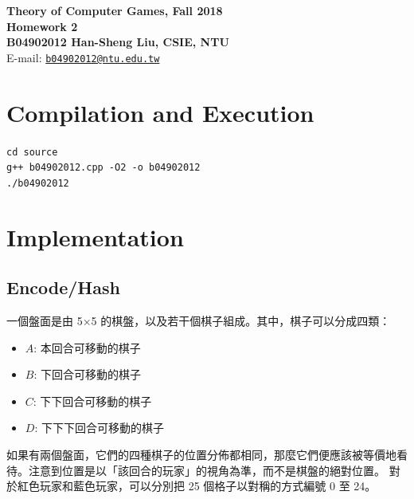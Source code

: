 \documentclass[12pt,a4paper]{article}
\begin{document}
\begin{center}
\textbf{\Large Theory of Computer Games, Fall 2018\\}
\textbf{\Large Homework 2\\} 
\vspace{5pt}
\textbf{B04902012 Han-Sheng Liu, CSIE, NTU}\\
E-mail: \href{mailto:b04902012@ntu.edu.tw}{\texttt{b04902012@ntu.edu.tw}}\\

\end{center}
\vspace{5pt}
\section{Compilation and Execution}
\texttt{cd source}\\
\texttt{g++ b04902012.cpp -O2 -o b04902012}\\
\texttt{./b04902012}
\section{Implementation}
    \subsection{Encode/Hash}
        一個盤面是由 5$\times$5 的棋盤，以及若干個棋子組成。其中，棋子可以分成四類：
        \begin{itemize}
        \item \(A\): 本回合可移動的棋子
        \item \(B\): 下回合可移動的棋子
        \item \(C\): 下下回合可移動的棋子
        \item \(D\): 下下下回合可移動的棋子
        \end{itemize}
        如果有兩個盤面，它們的四種棋子的位置分佈都相同，那麼它們便應該被等價地看待。注意到位置是以「該回合的玩家」的視角為準，而不是棋盤的絕對位置。
        對於紅色玩家和藍色玩家，可以分別把 25 個格子以對稱的方式編號 0 至 24。
\end{document}
